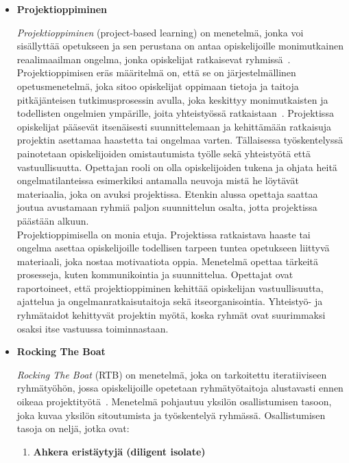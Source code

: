 \documentclass[finnish]{../tktltiki2}
\theoremstyle{definition}
\theoremstyle{remark}
\begin{document}
\begin{itemize}

\item {\bf Projektioppiminen}

\emph{Projektioppiminen} (project-based learning) on menetelmä, jonka voi sisällyttää opetukseen ja sen perustana on
antaa opiskelijoille monimutkainen reaalimaailman ongelma, jonka opiskelijat
ratkaisevat ryhmissä~\cite{5593527,Larmer:2009,Markham:2003}. Projektioppimisen eräs määritelmä on, että se on järjestelmällinen
opetusmenetelmä, joka sitoo opiskelijat oppimaan tietoja ja taitoja pitkäjänteisen tutkimusprosessin
avulla, joka keskittyy monimutkaisten ja todellisten ongelmien ympärille, joita yhteistyössä
ratkaistaan~\cite{Markham:2003}. Projektissa opiskelijat pääsevät itsenäisesti suunnittelemaan ja kehittämään
ratkaisuja projektin asettamaa haastetta tai ongelmaa varten. Tällaisessa työskentelyssä painotetaan opiskelijoiden omistautumista
työlle sekä yhteistyötä että vastuullisuutta. Opettajan rooli on olla opiskelijoiden tukena ja ohjata heitä
ongelmatilanteissa esimerkiksi antamalla neuvoja mistä he löytävät materiaalia, joka on avuksi projektissa.
Etenkin alussa opettaja saattaa joutua avustamaan ryhmiä paljon suunnittelun osalta, jotta projektissa päästään alkuun.\\

Projektioppimisella on monia etuja. Projektissa ratkaistava haaste tai ongelma asettaa opiskelijoille
todellisen tarpeen tuntea opetukseen liittyvä materiaali, joka nostaa motivaatiota oppia. Menetelmä opettaa
tärkeitä prosesseja, kuten kommunikointia ja suunnittelua. Opettajat ovat raportoineet, että projektioppiminen
kehittää opiskelijan vastuullisuutta, ajattelua ja ongelmanratkaisutaitoja sekä itseorganisointia. Yhteistyö-
ja ryhmätaidot kehittyvät projektin myötä, koska ryhmät ovat suurimmaksi osaksi itse vastuussa toiminnastaan.

\item {\bf Rocking The Boat}

\emph{Rocking The Boat} (RTB) on menetelmä, joka on tarkoitettu
iteratiiviseen ryhmätyöhön, jossa opiskelijoille opetetaan ryhmätyötaitoja alustavasti ennen oikeaa projektityötä~\cite{Pieterse:2012:PPS:2157136.2157218}. Menetelmä pohjautuu yksilön osallistumisen tasoon, joka kuvaa yksilön sitoutumista ja työskentelyä ryhmässä. Osallistumisen tasoja on neljä, jotka ovat:

\begin{enumerate}

\item {\bf Ahkera eristäytyjä (diligent isolate)}


\end{enumerate}
\end{itemize}
\end{document}

